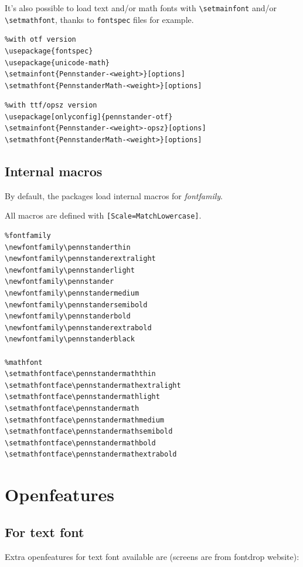 \documentclass[a4paper]{scrartcl}
\newcommand*{\opt}[1]{\texttt{#1}}
\newcommand*{\cmd}[1]{\texttt{\textbackslash #1}}\newcommand*{\showtchar}[1]{\cmd{#1}~\csname #1\endcsname}
\begin{document}
It's also possible to load text and/or math fonts with \cmd{setmainfont} and/or \cmd{setmathfont}, thanks to \opt{fontspec} files for example.

\begin{verbatim}
%with otf version
\usepackage{fontspec}
\usepackage{unicode-math}
\setmainfont{Pennstander-<weight>}[options]
\setmathfont{PennstanderMath-<weight>}[options]
\end{verbatim}

\begin{verbatim}
%with ttf/opsz version
\usepackage[onlyconfig]{pennstander-otf}
\setmainfont{Pennstander-<weight>-opsz}[options]
\setmathfont{PennstanderMath-<weight>}[options]
\end{verbatim}

\subsection{Internal macros}

By default, the packages load internal macros for \textit{fontfamily}.

All macros are defined with \opt{[Scale=MatchLowercase]}.

\begin{verbatim}
%fontfamily
\newfontfamily\pennstanderthin
\newfontfamily\pennstanderextralight
\newfontfamily\pennstanderlight
\newfontfamily\pennstander
\newfontfamily\pennstandermedium
\newfontfamily\pennstandersemibold
\newfontfamily\pennstanderbold
\newfontfamily\pennstanderextrabold
\newfontfamily\pennstanderblack

%mathfont
\setmathfontface\pennstandermaththin
\setmathfontface\pennstandermathextralight
\setmathfontface\pennstandermathlight
\setmathfontface\pennstandermath
\setmathfontface\pennstandermathmedium
\setmathfontface\pennstandermathsemibold
\setmathfontface\pennstandermathbold
\setmathfontface\pennstandermathextrabold
\end{verbatim}

\pagebreak

\section{Openfeatures}

\subsection{For text font}

Extra openfeatures for text font available are (screens are from fontdrop website):
\end{document}
